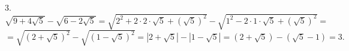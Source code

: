 3. $\sqrt{9+4\sqrt{5}}-\sqrt{6-2\sqrt{5}}=\sqrt{2^2+2\cdot2\cdot\sqrt{5}+(\sqrt{5})^2}-\sqrt{1^2-2\cdot1\cdot\sqrt{5}+(\sqrt{5})^2}=$\\$=
\sqrt{(2+\sqrt{5})^2}-\sqrt{(1-\sqrt{5})^2}=|2+\sqrt{5}|-|1-\sqrt{5}|=(2+\sqrt{5})-(\sqrt{5}-1)=3.$\\
